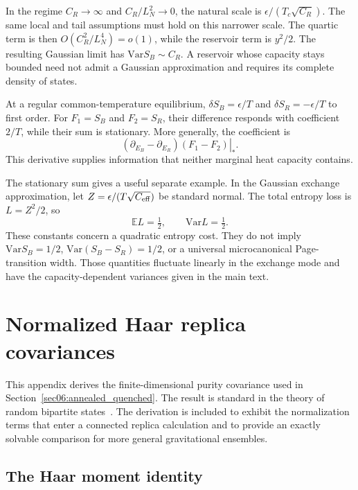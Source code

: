 \documentclass[11pt,letterpaper]{article}
\theoremstyle{plain}
\theoremstyle{definition}
\theoremstyle{remark}
\newcommand{\E}{\mathbb{E}}
\newcommand{\Var}{\text{Var}}
\begin{document}
In the regime $C_R\to\infty$ and $C_R/L_N^2\to0$, the natural scale
is $\epsilon/(T_c\sqrt{C_R})$. The same local and tail assumptions
must hold on this narrower scale. The quartic term is then
$O(C_R^2/L_N^4)=o(1)$, while the reservoir term is $y^2/2$.
The resulting Gaussian limit has
$\Var S_B\sim C_R$. A reservoir whose capacity stays bounded need not
admit a Gaussian approximation and requires its complete density of
states.

At a regular common-temperature equilibrium,
$\delta S_B=\epsilon/T$ and $\delta S_R=-\epsilon/T$ to first order.
For $F_1=S_B$ and $F_2=S_R$, their difference responds with coefficient
$2/T$, while their sum is stationary. More generally, the coefficient
is
\begin{equation}
 \left.(\partial_{E_B}-\partial_{E_R})(F_1-F_2)\right|_*.
 \label{eq13:response_coefficient}
\end{equation}
This derivative supplies information that neither marginal heat
capacity contains.

The stationary sum gives a useful separate example. In the Gaussian
exchange approximation, let $Z=\epsilon/(T\sqrt{C_{\rm eff}})$ be
standard normal. The total entropy loss is $L=Z^2/2$, so
\begin{equation}
 \E L=\tfrac12,\qquad \Var L=\tfrac12.
 \label{eq13:stationary_loss}
\end{equation}
These constants concern a quadratic entropy cost. They do not imply
$\Var S_B=1/2$, $\Var(S_B-S_R)=1/2$, or a universal microcanonical
Page-transition width. Those quantities fluctuate linearly in the
exchange mode and have the capacity-dependent variances given in the
main text.

\section{Normalized Haar replica covariances}
\label{sec14:appendix_discrimination}

This appendix derives the finite-dimensional purity covariance used in
Section~\ref{sec06:annealed_quenched}.  The result is standard in the
theory of random bipartite states~\citep{giraud2007}.  The derivation is
included to exhibit the normalization terms that enter a connected
replica calculation and to provide an exactly solvable comparison for
more general gravitational ensembles.

\subsection{The Haar moment identity}
\label{subsec14:haar_moments}
\end{document}

